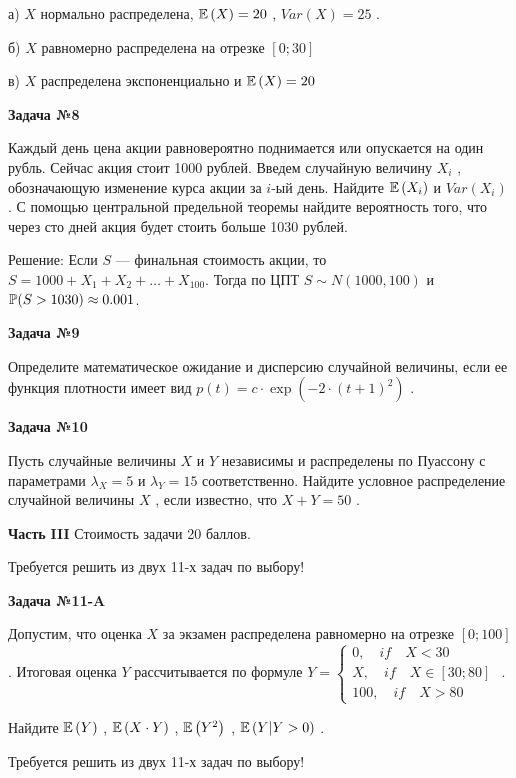 \documentclass[12pt, a4paper]{article}\usepackage[]{graphicx}\usepackage[]{color}
\begin{document}
а)  $X$  нормально распределена,  $\E\left(X\right)=20$ ,  $Var\left(X\right)=25$ .

б)  $X$  равномерно распределена на отрезке  $\left[0;30\right]$

в)  $X$  распределена экспоненциально и  $\E\left(X\right)=20$

{\bf Задача №8}

Каждый день цена акции равновероятно поднимается или опускается на один рубль. Сейчас акция стоит 1000 рублей. Введем случайную величину  $X_{i} $ , обозначающую изменение курса акции за  $i$-ый день. Найдите  $\E\left(X_{i} \right)$  и  $Var\left(X_{i} \right)$ . С помощью центральной предельной теоремы найдите вероятность того, что через сто дней акция будет стоить больше 1030 рублей.


Решение: Если $S$ — финальная стоимость акции, то $S=1000+X_1+X_2+\ldots+X_{100}$. Тогда по ЦПТ $S\sim N(1000,100)$ и $\P(S>1030)\approx 0.001$.

{\bf Задача №9}

Определите математическое ожидание и дисперсию случайной величины, если ее функция плотности имеет вид  $p\left(t\right)=c\cdot \exp \left(-2\cdot \left(t+1\right)^{2} \right)$ .

{\bf Задача №10}

Пусть случайные величины  $X$  и  $Y$  независимы и распределены по Пуассону с параметрами  $\lambda _{X} =5$  и  $\lambda _{Y} =15$  соответственно. Найдите условное распределение случайной величины  $X$ , если известно, что  $X+Y=50$ .

{\bf Часть }{\bf III} Стоимость задачи 20 баллов.

Требуется решить {\bf {}} из двух 11-х задач по выбору!

{\bf Задача №1}{\bf 1-}{\bf A}

Допустим, что оценка  $X$  за экзамен распределена равномерно на отрезке  $\left[0;100\right]$ . Итоговая оценка  $Y$  рассчитывается по формуле  $Y=\left\{\begin{array}{l} {0,\quad if\quad X<30} \\ {X,\quad if\quad X\in \left[30;80\right]} \\ {100,\quad if\quad X>80} \end{array}\right. $ .

Найдите  $\E\left(Y\right)$ ,  $\E\left(X\cdot Y\right)$ ,  $\E\left(Y^{2} \right)$ ,  $\E\left(Y|Y>0\right)$ .

Требуется решить {\bf {}} из двух 11-х задач по выбору!
\end{document}
